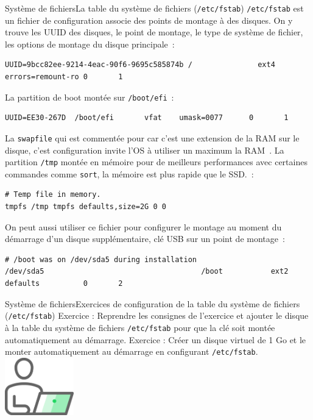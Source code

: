 \documentclass{beamer}
\begin{document}
    \begin{frame}[fragile]{Système de fichiers}{La table du système de fichiers (\lstinline{/etc/fstab})}
        \lstinline{/etc/fstab} est un fichier de configuration associe des points de montage à des disques.
        On y trouve les UUID des disques, le point de montage, le type de système de fichier, les options de montage du disque principale~:
        \begin{lstlisting}[basicstyle=\tiny\ttfamily]
UUID=9bcc82ee-9214-4eac-90f6-9695c585874b /               ext4    errors=remount-ro 0       1
        \end{lstlisting}
        La partition de boot montée sur \lstinline{/boot/efi}~:
        \begin{lstlisting}[basicstyle=\tiny\ttfamily]
UUID=EE30-267D  /boot/efi       vfat    umask=0077      0       1
        \end{lstlisting}
        La \lstinline{swapfile} qui est commentée pour car c'est une extension de la RAM sur le disque, c'est configuration invite l'OS à utiliser un maximum la RAM~.
        La partition \lstinline{/tmp} montée en mémoire pour de meilleurs performances avec certaines commandes comme \lstinline{sort}, la mémoire est plus rapide que le SSD.~:
        \begin{lstlisting}[basicstyle=\tiny\ttfamily]
# Temp file in memory.
tmpfs /tmp tmpfs defaults,size=2G 0 0
        \end{lstlisting}
        On peut aussi utiliser ce fichier pour configurer le montage au moment du démarrage d'un disque supplémentaire, clé USB sur un point de montage~:
        \begin{lstlisting}[basicstyle=\tiny\ttfamily]
# /boot was on /dev/sda5 during installation
/dev/sda5                                    /boot           ext2    defaults          0       2
        \end{lstlisting}
    \end{frame}

    \begin{frame}{Système de fichiers}{Exercices de configuration de la table du système de fichiers (\lstinline{/etc/fstab})}
        Exercice \execcounterdispinc: Reprendre les consignes de l'exercice  \theexemountcounter{} et ajouter le disque à la table du système de fichiers \lstinline{/etc/fstab} pour que la clé soit montée automatiquement au démarrage.
        \bigbreak
        Exercice \execcounterdispinc: Créer un disque virtuel de 1 Go et le monter automatiquement au démarrage en configurant \lstinline{/etc/fstab}.
        \bigbreak
        \centering
        \includegraphics[width=3cm]{image/guy-in-front-of-desktop}
    \end{frame}
\end{document}
